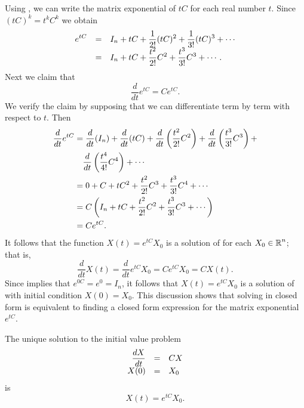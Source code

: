 \documentclass{ximera}
\begin{document}
Using , we can write the matrix exponential of $tC$
for each real number $t$.  Since $(tC)^k = t^k C^k$ we obtain
\arraystart
\begin{equation}  \label{eq:MatrixExp}
\begin{array}{rcl}
\displaystyle e^{tC} & = & \displaystyle I_n + tC + \frac{1}{2!} (tC)^2 + \frac{1}{3!} (tC)^3
+\cdots\\
\displaystyle & = & \displaystyle I_n + tC + \frac{t^2}{2!} C^2 + \frac{t^3}{3!} C^3 +\cdots.
\end{array}
\end{equation}
\arrayfinish
Next we claim that
\begin{equation}  \label {e:diffmatexp}
  \frac{d}{dt} e^{tC} = Ce^{tC}.
\end{equation}
We verify the claim by supposing that we can differentiate
 term by term with respect to $t$. Then
\begin{align*}
  \displaystyle\frac{d}{dt} e^{tC} & = \frac{d}{dt}(I_n) + \frac{d}{dt}(tC)
  + \frac{d}{dt}\left(\frac{t^2}{2!} C^2\right) + 
                            \frac{d}{dt}\left(\frac{t^3}{3!} C^3\right) + \\
                          &\quad
  \frac{d}{dt}\left(\frac{t^4}{4!}C^4\right) + \cdots\\
     & = 0 + C + t C^2 + \frac{t^2}{2!} C^3 +
\frac{t^3}{3!} C^4 + \cdots\\
     & = C\left(I_n + tC + \frac{t^2}{2!} C^2 + \frac{t^3}{3!} C^3
+\cdots\right)\\
     & = Ce^{tC}.
\end{align*}
It follows that the function $X(t) = e^{tC}X_0$ is a solution of
 for each $X_0\in\mbox{$\Bbb{R}$}^n$; that is,
\[
     \frac{d}{dt} X(t) =  \frac{d}{dt}  e^{tC}X_0
     = C e^{tC}X_0 = C X(t).
\]
Since  implies that $e^{0C} = e^0 = I_n$, it follows
that $X(t) = e^{tC}X_0$ is a solution of  with
initial condition $X(0)=X_0$.  This discussion shows that solving
 in closed form is equivalent to finding a closed
form expression for the matrix exponential $e^{tC}$.

\begin{theorem}  \label{T:linODEsoln}
The unique solution to the
initial value problem
\arraystart
\[
\begin{array}{rcl}
\displaystyle\frac{dX}{dt} & = & CX \\
X(0) & = & X_0
\end{array}
\]
\arrayfinish
is
\[
X(t)=e^{tC}X_0.
\]
\end{theorem}
\end{document}

